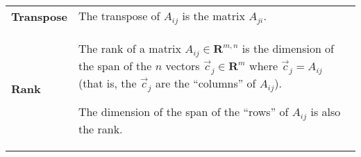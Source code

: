 \documentclass[10pt, a4paper, landscape]{article}
\newcommand{\defn}[1]{\textbf{#1}}
\newcommand{\set}[1]{\mathbold{#1}}
\begin{document}
\begin{multicols*}{3}
\begin{tabularx}{\columnwidth}{@{}l>{\raggedright\arraybackslash}X@{}}

  \defn{Transpose} & The transpose of $A_{ij}$ is the matrix $A_{ji}$.
  \\

  \defn{Rank} & The rank of a matrix $A_{ij}\in\set{R}^{m,n}$ is the
  dimension of the span of the $n$ vectors $\vec{c}_j\in \set{R}^m$ where
  $\vec{c}_j = A_{ij}$ (that is, the $\vec{c}_j$ are the ``columns'' of
  $A_{ij}$).

 The dimension of the span of the ``rows'' of $A_{ij}$ is also the rank.
 
\end{tabularx}

\end{multicols*}
\end{document}
